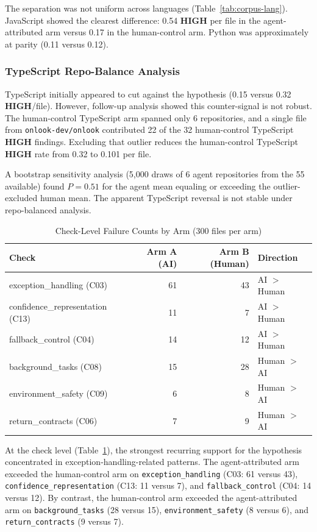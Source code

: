 \documentclass[11pt]{article}
\newcommand{\checkid}[1]{\texttt{#1}}
\newcommand{\HIGH}{\textcolor{aira-red}{\textbf{HIGH}}}
\begin{document}
The separation was not uniform across languages (Table~\ref{tab:corpus-lang}). JavaScript
showed the clearest difference: 0.54 \HIGH{} per file in the agent-attributed arm versus
0.17 in the human-control arm. Python was approximately at parity (0.11 versus 0.12).

\subsubsection{TypeScript Repo-Balance Analysis}
\label{sec:typescript-note}

TypeScript initially appeared to cut against the hypothesis (0.15 versus 0.32 \HIGH{}/file).
However, follow-up analysis showed this counter-signal is not robust. The human-control
TypeScript arm spanned only 6 repositories, and a single file from \texttt{onlook-dev/onlook}
contributed 22 of the 32 human-control TypeScript \HIGH{} findings. Excluding that outlier
reduces the human-control TypeScript \HIGH{} rate from 0.32 to 0.101 per file.

A bootstrap sensitivity analysis (5,000 draws of 6 agent repositories from the 55 available)
found $P = 0.51$ for the agent mean equaling or exceeding the outlier-excluded human mean.
The apparent TypeScript reversal is not stable under repo-balanced analysis.

\begin{table}[htbp]
\centering
\caption{Check-Level Failure Counts by Arm (300 files per arm)}
\label{tab:corpus-checks}
\small
\begin{tabular}{@{}lrrl@{}}
\toprule
\textbf{Check} & \textbf{Arm A (AI)} & \textbf{Arm B (Human)} & \textbf{Direction} \\
\midrule
exception\_handling (C03) & 61 & 43 & AI $>$ Human \\
confidence\_representation (C13) & 11 & 7 & AI $>$ Human \\
fallback\_control (C04) & 14 & 12 & AI $>$ Human \\
\midrule
background\_tasks (C08) & 15 & 28 & Human $>$ AI \\
environment\_safety (C09) & 6 & 8 & Human $>$ AI \\
return\_contracts (C06) & 7 & 9 & Human $>$ AI \\
\bottomrule
\end{tabular}
\end{table}

At the check level (Table~\ref{tab:corpus-checks}), the strongest recurring support for the
hypothesis concentrated in exception-handling-related patterns. The agent-attributed arm
exceeded the human-control arm on \checkid{exception\_handling} (C03: 61 versus 43),
\checkid{confidence\_representation} (C13: 11 versus 7), and \checkid{fallback\_control}
(C04: 14 versus 12). By contrast, the human-control arm exceeded the agent-attributed arm
on \checkid{background\_tasks} (28 versus 15), \checkid{environment\_safety} (8 versus 6),
and \checkid{return\_contracts} (9 versus 7).
\end{document}
